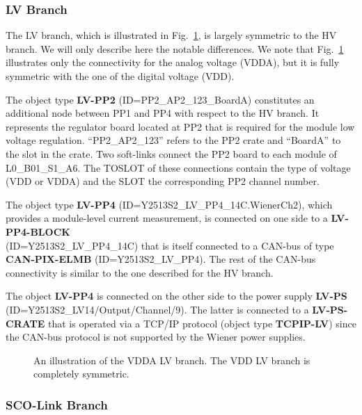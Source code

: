 \subsubsection{LV Branch}

The LV branch, which is illustrated in Fig.~\ref{fig:branch_lv}, is largely symmetric to the HV branch. We will only 
describe here the notable differences. 
We note that Fig.~\ref{fig:branch_lv} illustrates only the connectivity for the analog voltage (VDDA), but it is
fully symmetric with the one of the digital voltage (VDD).

The object type {\bf LV-PP2} (ID=PP2\_AP2\_123\_BoardA) constitutes an additional node between PP1 and PP4 with 
respect to the HV branch.
It represents the regulator board located at PP2 that is required for the module low voltage regulation. ``PP2\_AP2\_123'' refers to 
the PP2 crate and ``BoardA'' to the slot in the crate. Two soft-links connect the PP2 board to each module
of L0\_B01\_S1\_A6. The TOSLOT
of these connections contain the type of voltage (VDD or VDDA) and the SLOT the corresponding PP2 channel number.

The object type {\bf LV-PP4} (ID=Y2513S2\_LV\_PP4\_14C.WienerCh2),
which provides a module-level current measurement, is connected on one side to a {\bf LV-PP4-BLOCK}\\ 
(ID=Y2513S2\_LV\_PP4\_14C) that is itself connected to a CAN-bus of type {\bf CAN-PIX-ELMB} (ID=Y2513S2\_LV\_PP4).
The rest of the CAN-bus connectivity is similar to the one described for the HV branch. 

The object {\bf LV-PP4} is connected
on the other side to the power supply {\bf LV-PS}\\ (ID=Y2513S2\_LV14/Output/Channel/9). The latter is
connected to a {\bf LV-PS-CRATE} that is operated via a TCP/IP protocol (object type 
{\bf TCPIP-LV}) since the CAN-bus protocol is not supported by the Wiener power supplies. 

\begin{figure}
\begin{center}
\end{center}
\caption{An illustration of the VDDA LV branch. The VDD LV branch is completely symmetric.}
\label{fig:branch_lv}
\end{figure}

\subsubsection{SCO-Link Branch}


